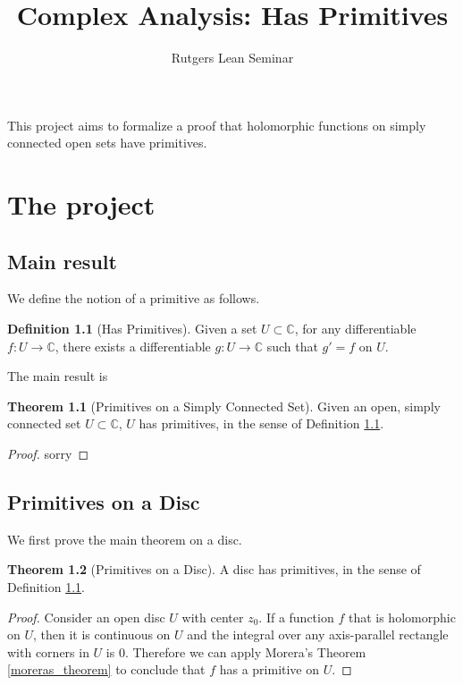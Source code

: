 \documentclass{report}
\title{Complex Analysis: Has Primitives}
\author{Rutgers Lean Seminar}
\theoremstyle{definition}
\newtheorem{definition}{Definition}
\newtheorem{theorem}{Theorem}
\begin{document}
\maketitle

This project aims to formalize a proof that holomorphic functions on simply connected open sets have primitives.

\chapter{The project}

\section{Main result}


We define the notion of a primitive as follows.

\begin{definition}[Has Primitives]
  \label{HasPrimitives}
  \leanok
  Given a set $U\subset\mathbb C$, for any differentiable $f:U\to\mathbb C$, there exists a differentiable $g:U\to\mathbb C$ such that $g'=f$ on $U$.
\end{definition}

The main result is

\begin{theorem}[Primitives on a Simply Connected Set]
  \label{hasPrimitives_of_simplyConnected}
  \leanok
  Given an open, simply connected set $U\subset\mathbb C$, $U$ has primitives, in the sense of Definition \ref{HasPrimitives}.
\end{theorem}

\begin{proof}
  sorry
\end{proof}

\section{Primitives on a Disc}
We first prove the main theorem on a disc.

\begin{theorem}[Primitives on a Disc]
  \label{hasPrimitives_of_disc}
  \leanok
  A disc has primitives, in the sense of Definition \ref{HasPrimitives}.
\end{theorem}

\begin{proof}
  Consider an open disc $U$ with center $z_0$.
  If a function $f$ that is holomorphic on $U$, then it is continuous on $U$ and the integral
  over any axis-parallel rectangle with corners in $U$ is $0$. Therefore we can apply Morera's Theorem \ref{moreras_theorem} to conclude that $f$ has a primitive on $U$.
\end{proof}
\end{document}
